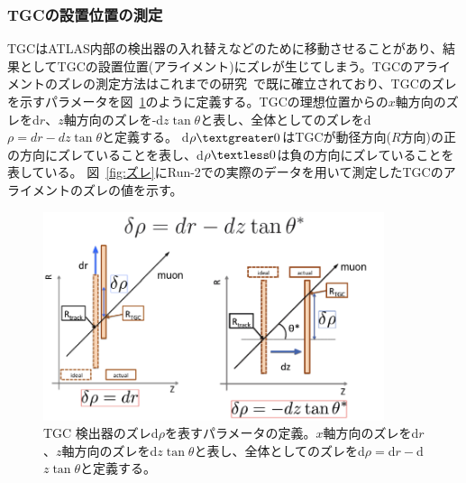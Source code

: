 \subsubsection{TGCの設置位置の測定}\label{ズレ}
TGCはATLAS内部の検出器の入れ替えなどのために移動させることがあり、結果としてTGCの設置位置(アライメント)にズレが生じてしまう。TGCのアライメントのズレの測定方法はこれまでの研究~\cite{article:sano-mron}で既に確立されており、TGCのズレを示すパラメータを図~\ref{fig:dr_para}のように定義する。TGCの理想位置からの$x$軸方向のズレをd$r$、$z$軸方向のズレを-d$z\tan\theta$と表し、全体としてのズレをd$\rho = dr-dz\tan\theta$と定義する。
d$\rho \textgreater 0$はTGCが動径方向($R$方向)の正の方向にズレていることを表し、d$\rho \textless 0$は負の方向にズレていることを表している。
図~\ref{fig:ズレ}にRun-2での実際のデータを用いて測定したTGCのアライメントのズレの値を示す。
\begin{figure}[tb]
  \centering
  \includegraphics[clip, width=10cm]{fig/3/drho_param_position_measurement.png}
  \caption{TGC 検出器のズレd$\rho$を表すパラメータの定義\cite{article:yamauti-mron}。$x$軸方向のズレをd$r$、$z$軸方向のズレをd$z\tan\theta$と表し、全体としてのズレをd$\rho = $d$r - $d$z\tan\theta$と定義する。}
  \label{fig:dr_para}
\end{figure}

